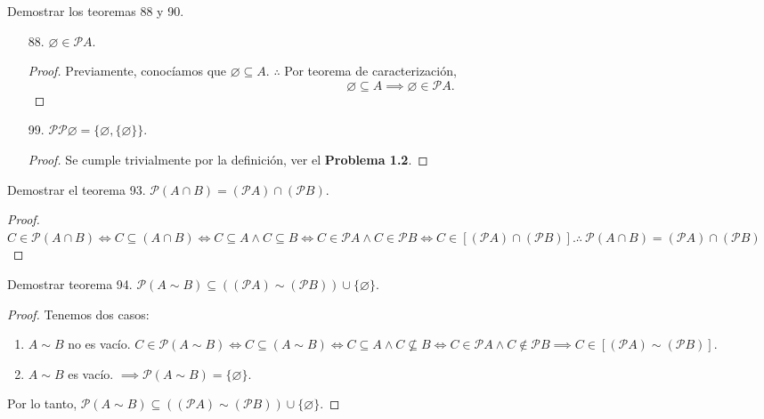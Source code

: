 
	\begin{problema}
	Demostrar los teoremas 88 y 90. 
	\begin{enumerate}
		\item[88.] $\varnothing\in \mathcal{P}A$.
		\begin{proof}
			Previamente, conocíamos que $\varnothing \subseteq A$. $\therefore$ Por teorema de caracterización, $$\varnothing \subseteq A \implies \varnothing\in \mathcal{P}A.$$		\end{proof}
		
		\item[99.] $\mathcal{P}\mathcal{P}\varnothing=\{\varnothing,\{\varnothing\}\}$.
		\begin{proof}
			Se cumple trivialmente por la definición, ver el \textbf{Problema 1.2}. 
		\end{proof}
	\end{enumerate}
\end{problema}


	\begin{problema}
	Demostrar el teorema 93. $\mathcal{P}(A\cap B)=(\mathcal{P} A)\cap (\mathcal{P}B)$. 
\end{problema}
\begin{proof}
	$C\in \mathcal{P}(A\cap B) \iff C\subseteq (A\cap B)\iff C\subseteq  A \wedge C\subseteq  B \iff C\in   \mathcal{P}A \wedge C\in  \mathcal{P} B\iff  C\in [(\mathcal{P} A)\cap (\mathcal{P}B)]. \therefore \ \mathcal{P}(A\cap B)=(\mathcal{P} A)\cap (\mathcal{P}B)$
\end{proof}

	\begin{problema}
	Demostrar teorema 94. $\mathcal{P}(A \sim B)\subseteq ((\mathcal{P}A)\sim(\mathcal{P}B) )\cup \{\varnothing\}$.
\end{problema}
\begin{proof}
	
	Tenemos dos casos: 
	\begin{enumerate}
		\item $A\sim B$ no es vacío. $C\in \mathcal{P}(A \sim B) \iff C\subseteq (A\sim B)\iff C\subseteq A \wedge C\not\subseteq B\iff C\in \mathcal{P}A \wedge C\not\in \mathcal{P}B\implies C\in [(\mathcal{P}A) \sim (\mathcal{P} B)]$.
		\item $A\sim B$ es vacío. $\implies \mathcal{P}(A\sim B)= \{\varnothing\}$.
	\end{enumerate}
	
	 Por lo tanto, $\mathcal{P}(A \sim B)\subseteq ((\mathcal{P}A)\sim(\mathcal{P}B) )\cup \{\varnothing\}$.
\end{proof}

